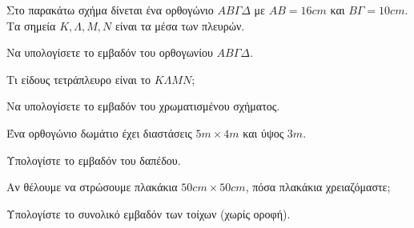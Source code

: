 \documentclass[11pt,a4paper,modern]{FFExercises}
\begin{document}
\askhsh Στο παρακάτω σχήμα δίνεται ένα ορθογώνιο $AB\varGamma\varDelta$ με $AB=16\si{cm}$ και $B\varGamma=10\si{cm}$. Τα σημεία $K,\varLambda,M,N$ είναι τα μέσα των πλευρών.
\begin{center}
\end{center}
\begin{alist}
\item Να υπολογίσετε το εμβαδόν του ορθογωνίου $AB\varGamma\varDelta$.
\item Τι είδους τετράπλευρο είναι το $K\varLambda MN$;
\item Να υπολογίσετε το εμβαδόν του χρωματισμένου σχήματος.
\end{alist}

\askhsh Ένα ορθογώνιο δωμάτιο έχει διαστάσεις $5\si{m}\times 4\si{m}$ και ύψος $3\si{m}$.
\begin{alist}
\item Υπολογίστε το εμβαδόν του δαπέδου.
\item Αν θέλουμε να στρώσουμε πλακάκια $50\si{cm}\times 50\si{cm}$, πόσα πλακάκια χρειαζόμαστε;
\item Υπολογίστε το συνολικό εμβαδόν των τοίχων (χωρίς οροφή).
\end{alist}
\end{document}
